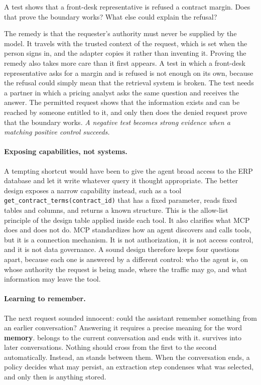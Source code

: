 \begin{thinkabout}
A test shows that a front-desk representative is refused a contract margin. Does that prove the boundary works? What else could explain the refusal?
\end{thinkabout}

The remedy is that the requester's authority must never be supplied by the model. It travels with the trusted context of the request, which is set when the person signs in, and the adapter copies it rather than inventing it. Proving the remedy also takes more care than it first appears. A test in which a front-desk representative asks for a margin and is refused is not enough on its own, because the refusal could simply mean that the retrieval system is broken. The test needs a partner in which a pricing analyst asks the same question and receives the answer. The permitted request shows that the information exists and can be reached by someone entitled to it, and only then does the denied request prove that the boundary works. \emph{A negative test becomes strong evidence when a matching positive control succeeds.}

\paragraph{Exposing capabilities, not systems.} A tempting shortcut would have been to give the agent broad access to the ERP database and let it write whatever query it thought appropriate. The better design exposes a narrow capability instead, such as a tool \texttt{get\_contract\_terms(contract\_id)} that has a fixed parameter, reads fixed tables and columns, and returns a known structure. This is the allow-list principle of the design table applied inside each tool. It also clarifies what MCP does and does not do. MCP standardizes how an agent discovers and calls tools, but it is a connection mechanism. It is not authorization, it is not access control, and it is not data governance. A sound design therefore keeps four questions apart, because each one is answered by a different control: who the agent is, on whose authority the request is being made, where the traffic may go, and what information may leave the tool.

\paragraph{Learning to remember.} The next request sounded innocent: could the assistant remember something from an earlier conversation? Answering it requires a precise meaning for the word \textbf{memory}.  belongs to the current conversation and ends with it.  survives into later conversations. Nothing should cross from the first to the second automatically. Instead, an  stands between them. When the conversation ends, a policy decides what may persist, an extraction step condenses what was selected, and only then is anything stored.

